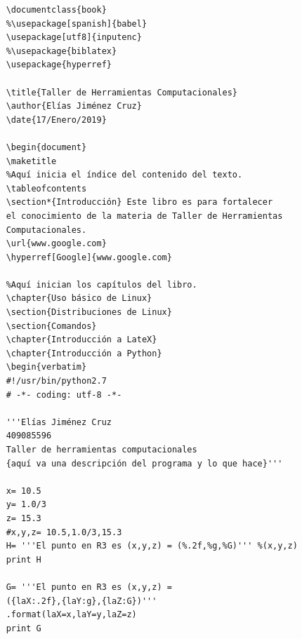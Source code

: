 \documentclass{book}
\begin{document}
	\begin{verbatim}
	\documentclass{book}
	%\usepackage[spanish]{babel}
	\usepackage[utf8]{inputenc}
	%\usepackage{biblatex}
	\usepackage{hyperref}
	
	\title{Taller de Herramientas Computacionales}
	\author{Elías Jiménez Cruz}
	\date{17/Enero/2019}
	
	\begin{document}
	\maketitle
	%Aquí inicia el índice del contenido del texto.
	\tableofcontents
	\section*{Introducción} Este libro es para fortalecer 
	el conocimiento de la materia de Taller de Herramientas 
	Computacionales.
	\url{www.google.com}
	\hyperref[Google]{www.google.com}
	
	%Aquí inician los capítulos del libro.
	\chapter{Uso básico de Linux}
	\section{Distribuciones de Linux}
	\section{Comandos}
	\chapter{Introducción a LateX}
	\chapter{Introducción a Python}
	\begin{verbatim}
	#!/usr/bin/python2.7
	# -*- coding: utf-8 -*-
	
	'''Elías Jiménez Cruz
	409085596
	Taller de herramientas computacionales
	{aquí va una descripción del programa y lo que hace}'''
	
	x= 10.5
	y= 1.0/3
	z= 15.3
	#x,y,z= 10.5,1.0/3,15.3
	H= '''El punto en R3 es (x,y,z) = (%.2f,%g,%G)''' %(x,y,z)
	print H
	
	G= '''El punto en R3 es (x,y,z) = 
	({laX:.2f},{laY:g},{laZ:G})''' 
	.format(laX=x,laY=y,laZ=z)
	print G
	

\end{verbatim}
\end{document}

